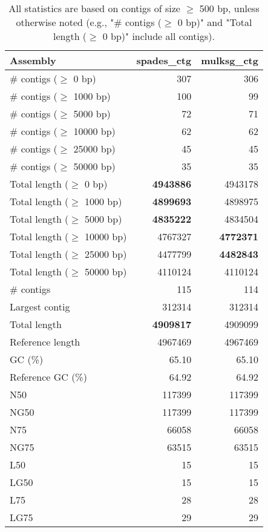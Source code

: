 \documentclass[12pt,a4paper]{article}
\begin{document}
\begin{table}[ht]
\begin{center}
\caption{All statistics are based on contigs of size $\geq$ 500 bp, unless otherwise noted (e.g., "\# contigs ($\geq$ 0 bp)" and "Total length ($\geq$ 0 bp)" include all contigs).}
\begin{tabular}{|l*{2}{|r}|}
\hline
Assembly & spades\_ctg & mulksg\_ctg \\ \hline
\# contigs ($\geq$ 0 bp) & 307 & 306 \\ \hline
\# contigs ($\geq$ 1000 bp) & 100 & 99 \\ \hline
\# contigs ($\geq$ 5000 bp) & 72 & 71 \\ \hline
\# contigs ($\geq$ 10000 bp) & 62 & 62 \\ \hline
\# contigs ($\geq$ 25000 bp) & 45 & 45 \\ \hline
\# contigs ($\geq$ 50000 bp) & 35 & 35 \\ \hline
Total length ($\geq$ 0 bp) & {\bf 4943886} & 4943178 \\ \hline
Total length ($\geq$ 1000 bp) & {\bf 4899693} & 4898975 \\ \hline
Total length ($\geq$ 5000 bp) & {\bf 4835222} & 4834504 \\ \hline
Total length ($\geq$ 10000 bp) & 4767327 & {\bf 4772371} \\ \hline
Total length ($\geq$ 25000 bp) & 4477799 & {\bf 4482843} \\ \hline
Total length ($\geq$ 50000 bp) & 4110124 & 4110124 \\ \hline
\# contigs & 115 & 114 \\ \hline
Largest contig & 312314 & 312314 \\ \hline
Total length & {\bf 4909817} & 4909099 \\ \hline
Reference length & 4967469 & 4967469 \\ \hline
GC (\%) & 65.10 & 65.10 \\ \hline
Reference GC (\%) & 64.92 & 64.92 \\ \hline
N50 & 117399 & 117399 \\ \hline
NG50 & 117399 & 117399 \\ \hline
N75 & 66058 & 66058 \\ \hline
NG75 & 63515 & 63515 \\ \hline
L50 & 15 & 15 \\ \hline
LG50 & 15 & 15 \\ \hline
L75 & 28 & 28 \\ \hline
LG75 & 29 & 29 \\ \hline

\end{tabular}
\end{center}
\end{table}
\end{document}
